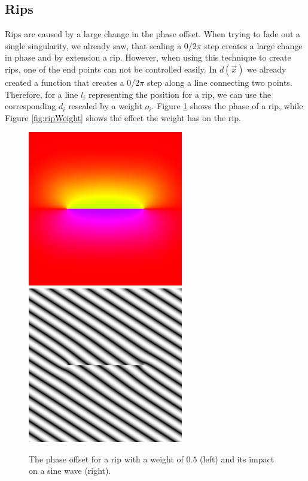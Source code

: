 \documentclass{utue} %
\begin{document}
\subsection{Rips}\label{sec:rips}
Rips are caused by a large change in the phase offset. When trying to fade out a single singularity, we already saw, that scaling a $0$/$2\pi$ step creates a large change in phase and by extension a rip. However, when using this technique to create rips, one of the end points can not be controlled easily. In $d(\vec{x})$ we already created a function that creates a $0$/$2\pi$ step along a line connecting two points. Therefore, for a line $l_i$ representing the position for a rip, we can use the corresponding $d_i$ rescaled by a weight $o_i$. Figure \ref{fig:ripPhase} shows the phase of a rip, while Figure \ref{fig:ripWeight} shows the effect the weight has on the rip.

\begin{figure}[ht]
  \centering
  \includegraphics[width=0.49\linewidth]{images/ripPhase}
  \includegraphics[width=0.49\linewidth]{images/rip05}
  \caption{The phase offset for a rip with a weight of $0.5$ (left) and its impact on a sine wave (right).}\label{fig:ripPhase}
\end{figure}
\end{document}
